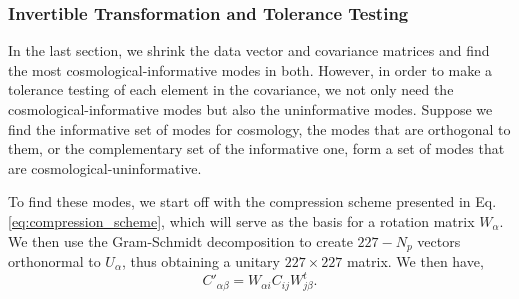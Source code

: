 \documentclass[twocolumn]{\docclass}
\newcommand\be{\begin{equation}}
\newcommand\ee{\end{equation}}
\begin{document}
	
	\subsubsection{Invertible Transformation and Tolerance Testing}
	
	In the last section, we shrink the data vector and covariance matrices and find the most cosmological-informative modes in both. However, in order to make a tolerance testing of each element in the covariance, we not only need the cosmological-informative modes but also the uninformative modes. Suppose we find the informative set of modes for cosmology, the modes that are orthogonal to them, or the complementary set of the informative one, form a set of modes that are cosmological-uninformative. 
	
	To find these modes, we start off with the compression scheme presented in Eq. \ref{eq:compression_scheme}, which will serve as the basis for a rotation matrix $W_\alpha$. We then use the Gram-Schmidt decomposition to create $227 - N_p$ vectors orthonormal to $U_{\alpha}$, thus obtaining a unitary $227 \times 227$ matrix. We then have,
	\be
	C'_{\alpha\beta} = W_{\alpha i} C_{ij} W^t_{j\beta}.
	\ee
	
\end{document}
